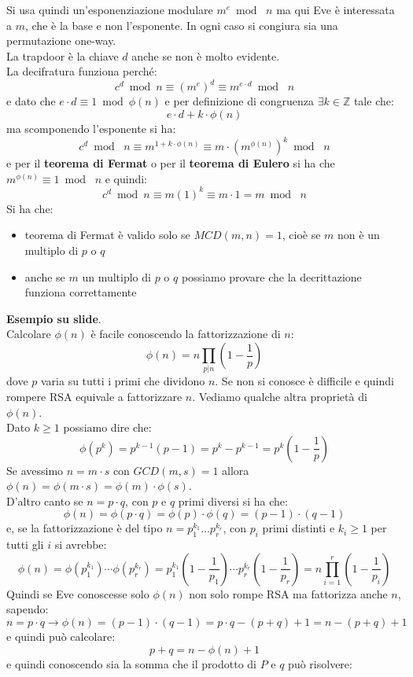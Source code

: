 \documentclass[a4paper,12pt, oneside]{book}
\begin{document}
Si usa quindi un'esponenziazione modulare $m^e\bmod\,\,n$ ma qui Eve è
interessata a $m$, che è la base e non l'esponente. In ogni caso si congiura sia
una permutazione one-way.\\
La trapdoor è la chiave $d$ anche se non è molto evidente.\\
La decifratura funziona perché:
\[c^d\bmod n\equiv (m^e)^d\equiv m^{e\cdot d}\bmod\,\,n\]
e dato che $e\cdot d\equiv 1\bmod\phi(n)$ e per definizione di congruenza
$\exists k\in\mathbb{Z}$ tale che:
\[e\cdot d+k\cdot\phi(n)\]
ma scomponendo l'esponente si ha:
\[c^d\bmod\,\,n\equiv m^{1+k\cdot\phi(n)}\equiv m\cdot (m^{\phi(n)})^k\bmod \,\,n\]
e per il \textbf{teorema di Fermat} o per il \textbf{teorema di Eulero} si ha
che $m^{\phi(n)}\equiv 1\bmod \,\,n$ e quindi:
\[c^d\bmod n\equiv m(1)^k\equiv m\cdot 1 = m\bmod \,\,n\]
Si ha che:
\begin{itemize}
  \item teorema di Fermat è valido solo se $MCD (m, n) = 1$, cioè se $m$ non è
  un   multiplo di $p$ o $q$ 
  \item anche se $m$ un multiplo di $p$ o $q$  possiamo provare
  che la decrittazione funziona correttamente 
\end{itemize}
\textbf{Esempio su slide}.\\
Calcolare $\phi(n)$ è facile conoscendo la fattorizzazione di $n$:
\[\phi(n)=n\prod_{p|n}\left(1-\frac{1}{p}\right)\]
dove $p$ varia su tutti i primi che dividono $n$. Se non si conosce è difficile
e quindi rompere RSA equivale a  fattorizzare $n$.
Vediamo qualche altra proprietà di $\phi(n)$. \\
Dato $k\geq 1$ possiamo dire che:
\[\phi(p^k)=p^{k-1}(p-1)=p^k-p^{k-1}=p^k\left(1-\frac{1}{p}\right)\]
Se avessimo $n=m\cdot s$ con $GCD(m,s)=1$ allora $\phi(n)=\phi(m\cdot
s)=\phi(m)\cdot \phi(s)$.\\
D'altro canto se $n=p\cdot q$, con $p$ e $q$ primi diversi si ha che:
\[\phi(n)=\phi(p\cdot q)=\phi(p)\cdot \phi(q)=(p-1)\cdot (q-1)\]
e, se la fattorizzazione è del tipo $n=p_1^{k_1}\ldots p_r^{k_r}$, con $p_i$
primi distinti e $k_i\geq 1$ per tutti gli $i$ si avrebbe:
\[\phi(n)=\phi(p_1^{k_1})\cdots
  \phi(p_r^{k_r})=p_1^{k_1}\left(1-\frac{1}{p_1}\right)\cdots
  p_r^{k_r}\left(1-\frac{1}{p_r}\right)=n\prod_{i=1}^r
  \left(1-\frac{1}{p_i}\right)\]
Quindi se Eve conoscesse solo $\phi(n)$ non solo rompe RSA ma fattorizza anche
$n$, sapendo:
\[n=p\cdot q\to \phi(n)=(p-1)\cdot(q-1)=p\cdot q-(p+q)+1=n-(p+q)+1\]
e quindi può calcolare:
\[p+q=n-\phi(n)+1\]
e quindi conoscendo sia la somma che il prodotto di $P$ e $q$ può risolvere:
\end{document}
